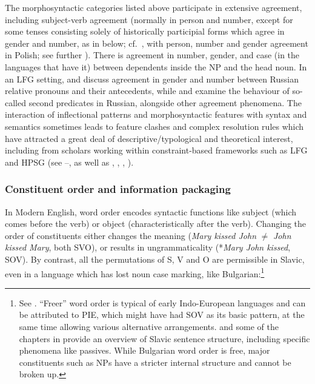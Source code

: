 \documentclass[output=paper,hidelinks]{langscibook}
\begin{document}
The morphosyntactic categories listed above participate in extensive agreement, including subject-verb agreement (normally in person and number, except for some tenses consisting solely of historically participial forms which agree in gender and number, as in  below; cf.\ , with person, number and gender agreement in Polish; see further \citealt[279--280]{SussexCubberley2006}). There is agreement in number, gender, and case (in the languages that have it) between dependents inside the NP and the head noun. In an LFG setting, \citet[146--148]{dalrymple01} and \citet[223--225]{DLM:LFG} discuss agreement in gender and number between Russian relative pronouns and their antecedents, while \citet{Neidle1982,Neidle1988} and \citet[402]{BresnanEtAl2016} examine the behaviour of so-called second predicates in Russian, alongside other agreement phenomena. The interaction of inflectional patterns and morphosyntactic features with syntax and semantics sometimes leads to feature clashes and complex resolution rules which have attracted a great deal of descriptive/typological and theoretical interest, including from scholars working within constraint-based frameworks such as LFG and HPSG (see --, as well as \citealt{Corbett1983}, \citealt[134--136]{Huntley1993}, \citealt[732--734]{Rothstein1993}, \citealt[865--866]{Timberlake1993}).

\largerpage
\subsubsection{Constituent order and information packaging}
\label{sec:Slavic:1.2.2}

In Modern English, word order encodes syntactic functions like subject (which comes before the verb) or object (characteristically after the verb). Changing the order of constituents either changes the meaning (\textit{Mary kissed John} ${\neq}$ \textit{John kissed Mary}, both SVO), or results in ungrammaticality (*\textit{Mary John kissed}, SOV). By contrast, all the permutations of S, V and O are permissible in Slavic, even in a language which has lost noun case marking, like Bulgarian:\footnote{See \citet[Chapter 2]{Rudin1985}. ``Freer'' word order is typical of early Indo-European languages and can be attributed to PIE, which might have had SOV as its basic pattern, at the same time allowing various alternative arrangements. \citet[Chapter~7]{SussexCubberley2006} and some of the chapters in \citet{BergerGutschmidtKempgenKosta2009} provide an overview of Slavic sentence structure, including specific phenomena like passives. While Bulgarian word order is free, major constituents such as NPs have a stricter internal structure and cannot be broken up.}
\end{document}
